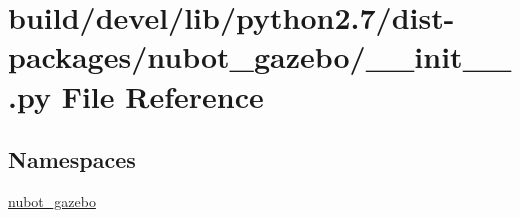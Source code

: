 \hypertarget{build_2devel_2lib_2python2_87_2dist-packages_2nubot__gazebo_2____init_____8py}{\section{build/devel/lib/python2.7/dist-\/packages/nubot\-\_\-gazebo/\-\_\-\-\_\-init\-\_\-\-\_\-.py File Reference}
\label{build_2devel_2lib_2python2_87_2dist-packages_2nubot__gazebo_2____init_____8py}
}
\subsection*{Namespaces}
\begin{DoxyCompactItemize}
\item 
\hyperlink{namespacenubot__gazebo}{nubot\-\_\-gazebo}
\end{DoxyCompactItemize}
